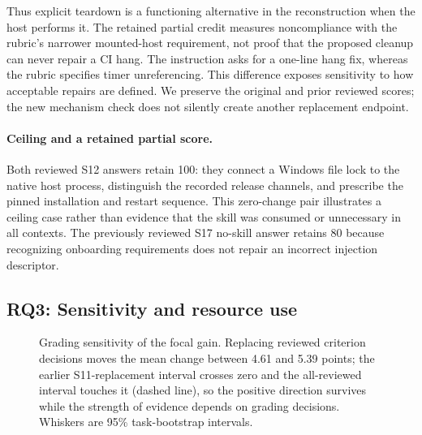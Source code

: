 \documentclass[11pt]{article}
\begin{document}
Thus explicit teardown is a functioning alternative in the reconstruction when the host performs it. The retained partial credit measures noncompliance with the rubric's narrower mounted-host requirement, not proof that the proposed cleanup can never repair a CI hang. The instruction asks for a one-line hang fix, whereas the rubric specifies timer unreferencing. This difference exposes sensitivity to how acceptable repairs are defined. We preserve the original and prior reviewed scores; the new mechanism check does not silently create another replacement endpoint.

\paragraph{Ceiling and a retained partial score.}
Both reviewed S12 answers retain 100: they connect a Windows file lock to the native host process, distinguish the recorded release channels, and prescribe the pinned installation and restart sequence. This zero-change pair illustrates a ceiling case rather than evidence that the skill was consumed or unnecessary in all contexts. The previously reviewed S17 no-skill answer retains 80 because recognizing onboarding requirements does not repair an incorrect injection descriptor.

\subsection{RQ3: Sensitivity and resource use}\label{sec:rq3}
\begin{figure}[t]
\centering
{}
\caption{Grading sensitivity of the focal gain. Replacing reviewed criterion decisions moves the mean change between 4.61 and 5.39 points; the earlier S11-replacement interval crosses zero and the all-reviewed interval touches it (dashed line), so the positive direction survives while the strength of evidence depends on grading decisions. Whiskers are 95\% task-bootstrap intervals.}
\label{fig:sensitivity}
\end{figure}
\end{document}
